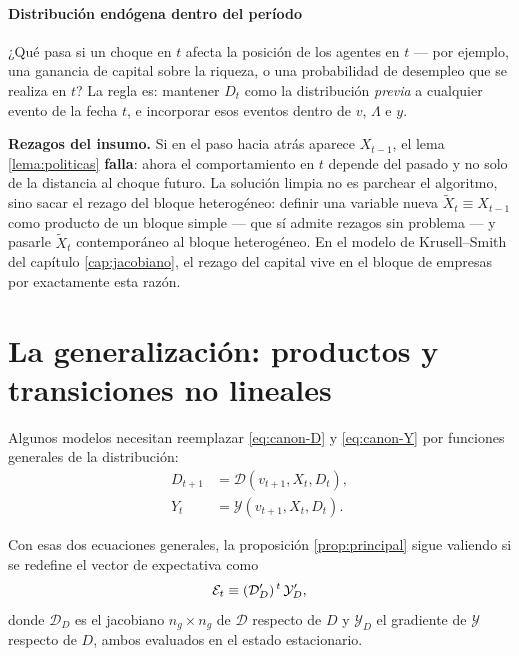 \paragraph{Distribución endógena dentro del período} ¿Qué pasa si un choque en
$t$ afecta la posición de los agentes en $t$ --- por ejemplo, una ganancia de
capital sobre la riqueza, o una probabilidad de desempleo que se realiza en $t$?
La regla es: mantener $D_t$ como la distribución \emph{previa} a cualquier evento
de la fecha $t$, e incorporar esos eventos dentro de $v$, $\Lambda$ e $y$.

\begin{trampa}
\textbf{Rezagos del insumo.} Si en el paso hacia atrás aparece $X_{t-1}$, el
lema \ref{lema:politicas} \textbf{falla}: ahora el comportamiento en $t$ depende
del pasado y no solo de la distancia al choque futuro. La solución limpia no es
parchear el algoritmo, sino sacar el rezago del bloque heterogéneo: definir una
variable nueva $\tilde X_t \equiv X_{t-1}$ como producto de un bloque simple
--- que sí admite rezagos sin problema --- y pasarle $\tilde X_t$
contemporáneo al bloque heterogéneo. En el modelo de Krusell--Smith del
capítulo \ref{cap:jacobiano}, el rezago del capital vive en el bloque de
empresas por exactamente esta razón.
\end{trampa}

\section{La generalización: productos y transiciones no lineales}

Algunos modelos necesitan reemplazar \eqref{eq:canon-D} y \eqref{eq:canon-Y} por
funciones generales de la distribución:
\begin{align}
D_{t+1} &= \mathcal{D}(v_{t+1}, X_t, D_t),\\
Y_t &= \mathcal{Y}(v_{t+1}, X_t, D_t).
\end{align}

\begin{proposicion}
\label{prop:general}
Con esas dos ecuaciones generales, la proposición \ref{prop:principal} sigue
valiendo si se redefine el vector de expectativa como
\begin{equation}
\mathcal{E}_t \equiv (\mathcal{D}_D')^{\,t}\,\mathcal{Y}_D',
\label{eq:E-general}
\end{equation}
donde $\mathcal{D}_D$ es el jacobiano $n_g\times n_g$ de $\mathcal{D}$ respecto de
$D$ y $\mathcal{Y}_D$ el gradiente de $\mathcal{Y}$ respecto de $D$, ambos
evaluados en el estado estacionario.
\end{proposicion}

